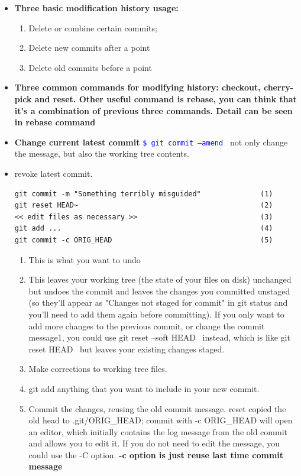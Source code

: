 \documentclass[a4paper,12pt,twoside]{book}
\newcommand{\linuxcommand}[1]{\texttt{\textcolor{blue}{\$ #1 \Pisymbol{psy}{191}}}}
\begin{document}
\begin{itemize}
\item \textbf{Three basic modification history usage:}
\begin{enumerate}
\item Delete or combine certain commits;
\item Delete new commits after a point
\item Delete old commits before a point
\end{enumerate}

\item \textbf{Three common commands for modifying history: checkout, cherry-pick and reset. Other useful command is rebase, you can think that it's a combination of previous three commands. Detail can be seen in rebase command}

  \item \textbf{Change current latest commit} \linuxcommand{git commit  --amend} not only change the message, but also the working tree contents. 
    
  \item revoke latest commit.
\begin{verbatim}
git commit -m "Something terribly misguided"              (1)
git reset HEAD~                                           (2)
<< edit files as necessary >>                             (3)
git add ...                                               (4)
git commit -c ORIG_HEAD                                   (5)
\end{verbatim}
\begin{enumerate}
\item This is what you want to undo
\item This leaves your working tree (the state of your files on disk) unchanged but undoes the commit and leaves the changes you committed unstaged (so they'll appear as "Changes not staged for commit" in git status and you'll need to add them again before committing). If you only want to add more changes to the previous commit, or change the commit message1, you could use git reset --soft HEAD~ instead, which is like git reset HEAD~ but leaves your existing changes staged.
\item Make corrections to working tree files.
\item git add anything that you want to include in your new commit.
\item Commit the changes, reusing the old commit message. reset copied the old head to .git/ORIG\_HEAD; commit with -c ORIG\_HEAD will open an editor, which initially contains the log message from the old commit and allows you to edit it. If you do not need to edit the message, you could use the -C option.  \textbf{-c option is just reuse last time commit message}
\end{enumerate}


\end{itemize}
\end{document}
